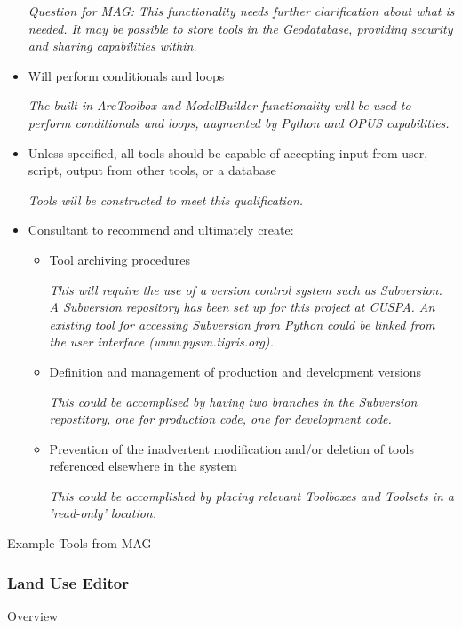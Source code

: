 \begin{itemize}
\emph{Question for MAG: This functionality needs further clarification about what is needed.  It may be possible to store tools in the Geodatabase, providing security and sharing capabilities within.}

\item Will perform conditionals and loops

\emph{The built-in ArcToolbox and ModelBuilder functionality will be used to perform conditionals and loops, augmented by Python and OPUS capabilities.}

\item Unless specified, all tools should be capable of accepting input from user, script, output from other tools, or a database

\emph{Tools will be constructed to meet this qualification.}

\item Consultant to recommend and ultimately create:
\begin{itemize}
\item Tool archiving procedures

\emph{This will require the use of a version control system such as Subversion. A Subversion repository has been set up for this project at CUSPA. An existing tool for accessing Subversion from Python could be linked from the user interface (www.pysvn.tigris.org). }

\item Definition and management of production and development versions

\emph{This could be accomplised by having two branches in the Subversion repostitory, one for production code, one for development code.}

\item Prevention of the inadvertent modification and/or deletion of tools referenced elsewhere in the system

\emph{This could be accomplished by placing relevant Toolboxes and Toolsets in a 'read-only' location.}

\end{itemize}
\end{itemize}

Example Tools from MAG

\subsubsection{Land Use Editor}

Overview

